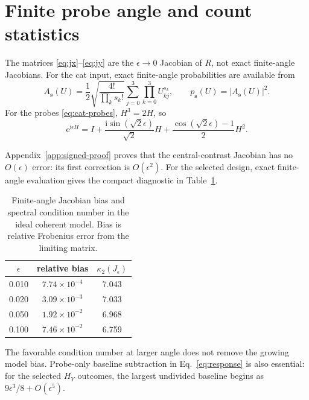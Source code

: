 \documentclass[aps,pra,reprint,amsmath,amssymb,superscriptaddress,longbibliography]{revtex4-2}
\newcommand{\ii}{\mathrm{i}}
\newcommand{\ee}{\mathrm{e}}
\begin{document}
\section{Finite probe angle and count statistics}
\label{sec:finite}

The matrices \eqref{eq:jx}--\eqref{eq:jy} are the
$\epsilon\rightarrow0$ Jacobian of $R$, not exact finite-angle
Jacobians.  For the cat input, exact finite-angle probabilities are
available from
\begin{equation}
 A_{\bm s}(U)
 =\frac12\sqrt{\frac{4!}{\prod_ks_k!}}
 \sum_{j=0}^{3}\prod_{k=0}^{3}U_{kj}^{s_k},
 \qquad p_{\bm s}(U)=|A_{\bm s}(U)|^2 .
\label{eq:cat-finite-amplitude}
\end{equation}
For the probes \eqref{eq:cat-probes}, $H^3=2H$, so
\begin{equation}
 \ee^{\ii\epsilon H}
 =I+\frac{\ii\sin(\sqrt2\epsilon)}{\sqrt2}H
 +\frac{\cos(\sqrt2\epsilon)-1}{2}H^2 .
\label{eq:probe-exponential}
\end{equation}

Appendix~\ref{app:signed-proof} proves that the central-contrast Jacobian
has no $O(\epsilon)$ error: its first correction is $O(\epsilon^2)$.
For the selected design, exact finite-angle evaluation gives the compact
diagnostic in Table~\ref{tab:finite-angle}.
\begin{table}[t]
\caption{Finite-angle Jacobian bias and spectral condition number in the
ideal coherent model.  Bias is relative Frobenius error from the limiting
matrix.}
\label{tab:finite-angle}
\begin{ruledtabular}
\begin{tabular}{ccc}
$\epsilon$ & relative bias & $\kappa_2(J_\epsilon)$\\
\hline
0.010 & $7.74\times10^{-4}$ & 7.043\\
0.020 & $3.09\times10^{-3}$ & 7.033\\
0.050 & $1.92\times10^{-2}$ & 6.968\\
0.100 & $7.46\times10^{-2}$ & 6.759
\end{tabular}
\end{ruledtabular}
\end{table}
The favorable condition number at larger angle does not remove the growing
model bias.  Probe-only baseline subtraction in Eq.~\eqref{eq:response} is
also essential: for the selected $H_Y$ outcomes, the largest undivided
baseline begins as $9\epsilon^3/8+O(\epsilon^5)$.
\end{document}
